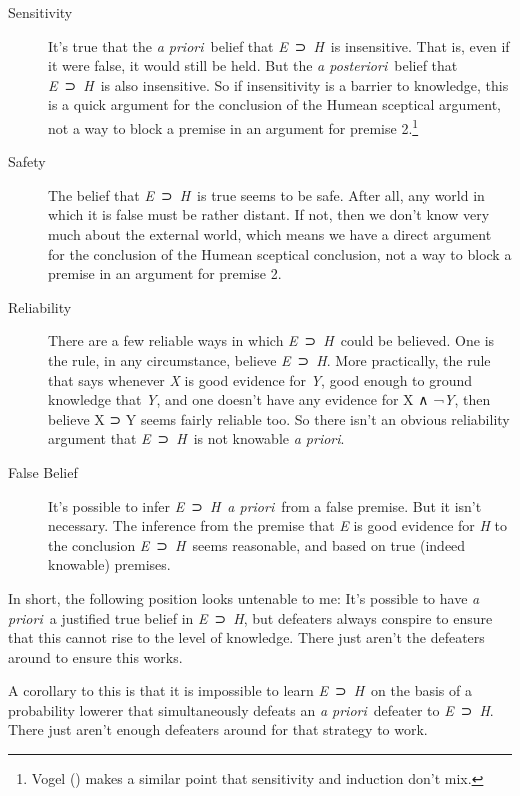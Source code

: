 \documentclass[
  11pt,
  letterpaper,
  DIV=11,
  numbers=noendperiod,
  twoside]{scrartcl}
\begin{document}
\begin{description}
\item[Sensitivity]
It's true that the \emph{a priori}~belief that \emph{E}~⊃~\emph{H}~is
insensitive. That is, even if it were false, it would still be held. But
the \emph{a posteriori}~belief that \emph{E}~⊃~\emph{H}~is also
insensitive. So if insensitivity is a barrier to knowledge, this is a
quick argument for the conclusion of the Humean sceptical argument, not
a way to block a premise in an argument for premise 2.\footnote{Vogel
  () makes a similar point that
  sensitivity and induction don't mix.}
\item[Safety]
The belief that \emph{E}~⊃~\emph{H}~is true seems to be safe. After all,
any world in which it is false must be rather distant. If not, then we
don't know very much about the external world, which means we have a
direct argument for the conclusion of the Humean sceptical conclusion,
not a way to block a premise in an argument for premise 2.
\item[Reliability]
There are a few reliable ways in which \emph{E}~⊃~\emph{H}~could be
believed. One is the rule, in any circumstance, believe
\emph{E}~⊃~\emph{H}. More practically, the rule that says whenever
\emph{X} is good evidence for \emph{Y}, good enough to ground knowledge
that \emph{Y}, and one doesn't have any evidence for X ∧ ¬\emph{Y}, then
believe X ⊃ Y seems fairly reliable too. So there isn't an obvious
reliability argument that \emph{E}~⊃~\emph{H}~is not knowable \emph{a
priori}.
\item[False Belief]
It's possible to infer \emph{E}~⊃~\emph{H}~\emph{a priori}~from a false
premise. But it isn't necessary. The inference from the premise that
\emph{E} is good evidence for \emph{H} to the conclusion
\emph{E}~⊃~\emph{H}~seems reasonable, and based on true (indeed
knowable) premises.
\end{description}

In short, the following position looks untenable to me: It's possible to
have \emph{a priori}~a justified true belief in \emph{E}~⊃~\emph{H}, but
defeaters always conspire to ensure that this cannot rise to the level
of knowledge. There just aren't the defeaters around to ensure this
works.

A corollary to this is that it is impossible to learn
\emph{E}~⊃~\emph{H}~on the basis of a probability lowerer that
simultaneously defeats an \emph{a priori}~defeater to
\emph{E}~⊃~\emph{H}. There just aren't enough defeaters around for that
strategy to work.
\end{document}

